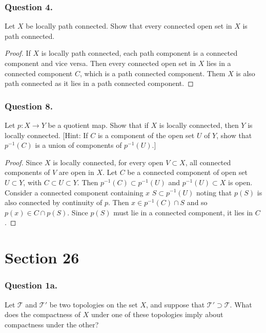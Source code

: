 \documentclass[12pt]{article}
\begin{document}

\subsubsection*{Question 4.}
Let $X$ be locally path connected. Show that every connected open set 
in $X$ is path connected.
\begin{proof}
    If $X$ is locally path connected, 
    each path component is a connected component and vice versa.
    Then every connected open set in $X$ lies in a connected component $C$,
    which is a path connected component. Them $X$ is also path connected as 
    it lies in a path connected component. 
    
\end{proof}

\subsubsection*{Question 8.}
Let \( p : X \to Y \) be a quotient map. Show that if 
\( X \) is locally connected, then \( Y \)
is locally connected. [Hint: If \( C \) is a component of 
the open set \( U \) of \( Y \), show
that \( p^{-1}(C) \) is a union of components 
of \( p^{-1}(U) \).]

\begin{proof}
    Since $X$ is locally connected, for every open 
    $V \subset X$, all connected
    components of $V$ are open in $X$.
    Let $C$ be a connected component of open set $U \subset Y$,
    with $C \subset U \subset Y$.
    Then $p^{-1}(C) \subset p^{-1}(U)$ and $p^{-1}(U) \subset X$
    is open. Consider a connected component containing $x$
    $S \subset p^{-1}(U)$ noting that $p(S)$ is also connected by continuity of $p$.
    Then $x \in p^{-1}(C) \cap S$ and so $p(x) \in C \cap p(S)$.
    Since $p(S)$ must lie in a connected component, it lies in $C$.
    

\end{proof}
\section{Section 26}
\subsubsection*{Question 1a.}
Let \( \mathcal{T} \) and \( \mathcal{T}' \) be two topologies 
on the set \( X \), and suppose that \( \mathcal{T}' \supset \mathcal{T} \). 
What does the compactness of \( X \) under one of these topologies imply about compactness under the other? 
\end{document}
